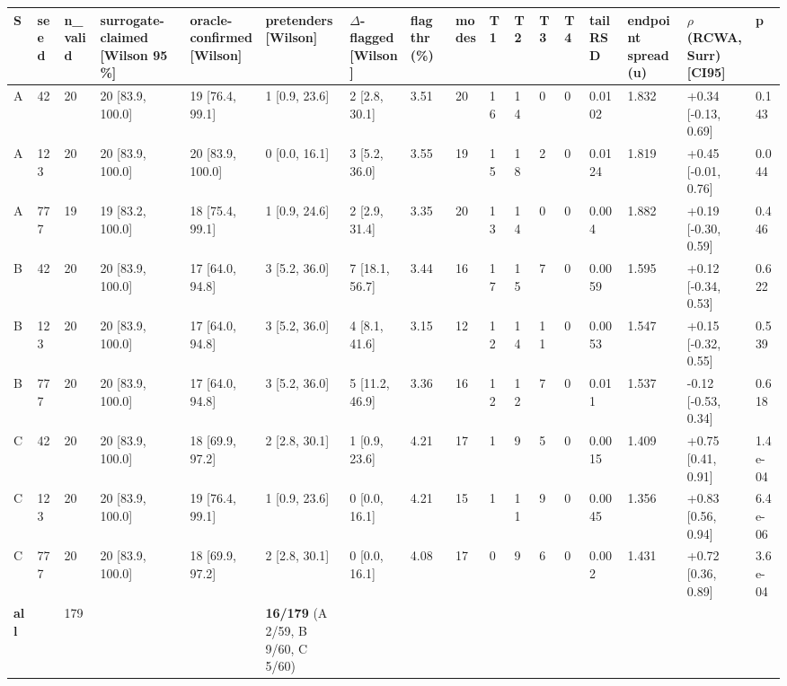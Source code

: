 \documentclass[11pt,a4paper]{article}
\newcounter{none}   %
\begin{document}
\begin{landscape}
\begingroup
\setlength{\tabcolsep}{2pt}\tiny
{}
\label{stab:1}
{\def\LTcaptype{none} %
\begin{longtable}[]{@{}lllllllllllllllll@{}}
\toprule\noalign{}
S & seed & n\_valid & surrogate-claimed {[}Wilson 95 \%{]} & oracle-confirmed {[}Wilson{]} & pretenders {[}Wilson{]} & \ensuremath{\Delta}-flagged {[}Wilson{]} & flag thr (\%) & modes & T1 & T2 & T3 & T4 & tail RSD & endpoint spread (u) & \ensuremath{\rho}(RCWA, Surr) {[}CI95{]} & p \\
\midrule\noalign{}
\endhead
\bottomrule\noalign{}
\endlastfoot
A & 42 & 20 & 20 {[}83.9, 100.0{]} & 19 {[}76.4, 99.1{]} & 1 {[}0.9, 23.6{]} & 2 {[}2.8, 30.1{]} & 3.51 & 20 & 16 & 14 & 0 & 0 & 0.0102 & 1.832 & +0.34 {[}-0.13, 0.69{]} & 0.143 \\
A & 123 & 20 & 20 {[}83.9, 100.0{]} & 20 {[}83.9, 100.0{]} & 0 {[}0.0, 16.1{]} & 3 {[}5.2, 36.0{]} & 3.55 & 19 & 15 & 18 & 2 & 0 & 0.0124 & 1.819 & +0.45 {[}-0.01, 0.76{]} & 0.044 \\
A & 777 & 19 & 19 {[}83.2, 100.0{]} & 18 {[}75.4, 99.1{]} & 1 {[}0.9, 24.6{]} & 2 {[}2.9, 31.4{]} & 3.35 & 20 & 13 & 14 & 0 & 0 & 0.004 & 1.882 & +0.19 {[}-0.30, 0.59{]} & 0.446 \\
B & 42 & 20 & 20 {[}83.9, 100.0{]} & 17 {[}64.0, 94.8{]} & 3 {[}5.2, 36.0{]} & 7 {[}18.1, 56.7{]} & 3.44 & 16 & 17 & 15 & 7 & 0 & 0.0059 & 1.595 & +0.12 {[}-0.34, 0.53{]} & 0.622 \\
B & 123 & 20 & 20 {[}83.9, 100.0{]} & 17 {[}64.0, 94.8{]} & 3 {[}5.2, 36.0{]} & 4 {[}8.1, 41.6{]} & 3.15 & 12 & 12 & 14 & 11 & 0 & 0.0053 & 1.547 & +0.15 {[}-0.32, 0.55{]} & 0.539 \\
B & 777 & 20 & 20 {[}83.9, 100.0{]} & 17 {[}64.0, 94.8{]} & 3 {[}5.2, 36.0{]} & 5 {[}11.2, 46.9{]} & 3.36 & 16 & 12 & 12 & 7 & 0 & 0.011 & 1.537 & -0.12 {[}-0.53, 0.34{]} & 0.618 \\
C & 42 & 20 & 20 {[}83.9, 100.0{]} & 18 {[}69.9, 97.2{]} & 2 {[}2.8, 30.1{]} & 1 {[}0.9, 23.6{]} & 4.21 & 17 & 1 & 9 & 5 & 0 & 0.0015 & 1.409 & +0.75 {[}0.41, 0.91{]} & 1.4e-04 \\
C & 123 & 20 & 20 {[}83.9, 100.0{]} & 19 {[}76.4, 99.1{]} & 1 {[}0.9, 23.6{]} & 0 {[}0.0, 16.1{]} & 4.21 & 15 & 1 & 11 & 9 & 0 & 0.0045 & 1.356 & +0.83 {[}0.56, 0.94{]} & 6.4e-06 \\
C & 777 & 20 & 20 {[}83.9, 100.0{]} & 18 {[}69.9, 97.2{]} & 2 {[}2.8, 30.1{]} & 0 {[}0.0, 16.1{]} & 4.08 & 17 & 0 & 9 & 6 & 0 & 0.002 & 1.431 & +0.72 {[}0.36, 0.89{]} & 3.6e-04 \\
\textbf{all} & & 179 & & & \textbf{16/179} (A 2/59, B 9/60, C 5/60) & & & & & & & & & & & \\
\end{longtable}
}
\endgroup
\end{landscape}
\end{document}
